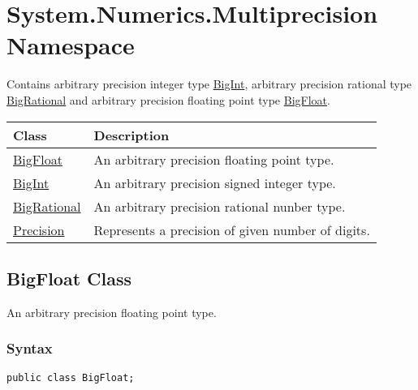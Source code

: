 \documentclass[a4paper,oneside,11.000000pt]{book}
\newcounter{subchapter}
\begin{document}
\hypertarget{System.Numerics.Multiprecision}{\chapter{System.Numerics.Multiprecision Namespace}}
\begin{flushleft}
Contains arbitrary precision integer type \hyperlink{System.Numerics.Multiprecision.BigInt}{BigInt}, arbitrary precision rational type \hyperlink{System.Numerics.Multiprecision.BigRational}{BigRational} and 
arbitrary precision floating point type \hyperlink{System.Numerics.Multiprecision.BigFloat}{BigFloat}.

\end{flushleft}
\clearpage
{}
\begin{flushleft}
\begin{supertabular}[l]{ll}
\textbf{Class}
& \textbf{Description}
\\
\hline
\hyperlink{System.Numerics.Multiprecision.BigFloat}{BigFloat}
& An arbitrary precision floating point type.

\\
\hyperlink{System.Numerics.Multiprecision.BigInt}{BigInt}
& An arbitrary precision signed integer type.

\\
\hyperlink{System.Numerics.Multiprecision.BigRational}{BigRational}
& An arbitrary precision rational nunber type.

\\
\hyperlink{System.Numerics.Multiprecision.Precision}{Precision}
& Represents a precision of given number of digits.

\\
\end{supertabular}

\end{flushleft}
\clearpage

\hypertarget{System.Numerics.Multiprecision.BigFloat}{\section{BigFloat Class}}\begin{flushleft}
An arbitrary precision floating point type.

\end{flushleft}

\subsection*{Syntax}\texttt{public class BigFloat;}
\end{document}
